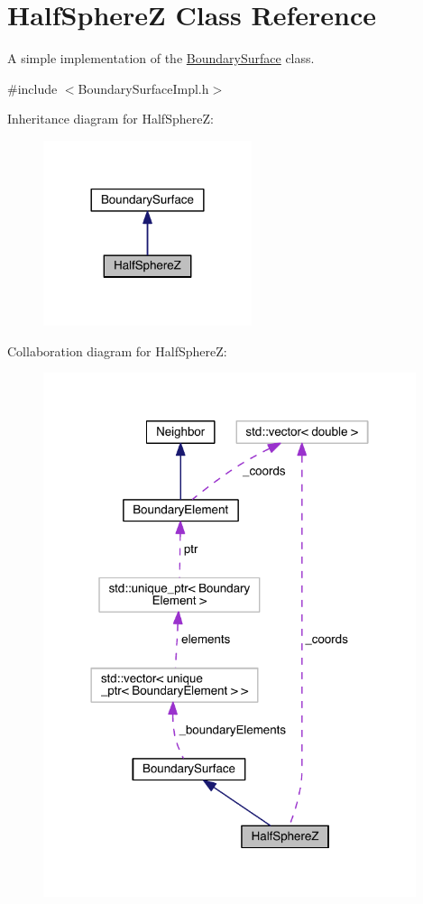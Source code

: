 \hypertarget{classHalfSphereZ}{\section{Half\+Sphere\+Z Class Reference}
\label{classHalfSphereZ}
}


A simple implementation of the \hyperlink{classBoundarySurface}{Boundary\+Surface} class.  




{\ttfamily \#include $<$Boundary\+Surface\+Impl.\+h$>$}



Inheritance diagram for Half\+Sphere\+Z\+:\nopagebreak
\begin{figure}[H]
\begin{center}
\leavevmode
\includegraphics[width=173pt]{classHalfSphereZ__inherit__graph}
\end{center}
\end{figure}


Collaboration diagram for Half\+Sphere\+Z\+:\nopagebreak
\begin{figure}[H]
\begin{center}
\leavevmode
\includegraphics[width=310pt]{classHalfSphereZ__coll__graph}
\end{center}
\end{figure}
